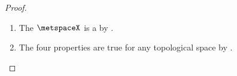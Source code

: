 \begin{proof}
\begin{enumerate}
  \item The  $\metspaceX$ is a  by .
  \item The four properties are true for any topological space by .
\end{enumerate}

%
%
%
%
%
%

\end{proof}
